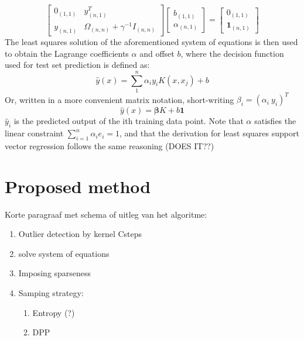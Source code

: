 \documentclass[preprint,12pt]{elsarticle}
\begin{document}
\begin{equation}
	\begin{bmatrix}
		0_{(1,1)} & y_{(n,1)}^T \\
		y_{(n,1)} & \Omega_{(n,n)} + \gamma^{-1} I_{(n,n)} 
		\end{bmatrix}	
		\begin{bmatrix}
		b_{(1,1)} \\
		\alpha_{(n,1)}
		\end{bmatrix}
		=
		\begin{bmatrix}
		0_{(1,1)} \\
		\mathbf{1}_{(n,1)}
	\end{bmatrix}	
\end{equation}
The least squares solution of the aforementioned system of equations is then used to  obtain the Lagrange coefficients $\alpha$ and offset $b$, where the decision function used for test set prediction is defined as:
\begin{equation}
	\hat{y}(x) = \sum_{1}^{n} \alpha_i y_i K(x, x_j) + b	
	\label{eq:classification}
\end{equation}
Or, written in a more convenient matrix notation, short-writing $\beta_i= (\alpha_i \  y_i)^T$
\begin{equation}
	\hat{y}(x) = \mathbf{\beta} K + b \mathbf{1}
	\label{eq:prediction}
\end{equation}
$\hat{y}_i$ is the predicted output of the ith training data point. Note that $\alpha$ satisfies the linear constraint $\sum_{i=1}^{n} \alpha_i  e_i = 1$, and that the derivation for least squares support vector regression follows the same reasoning (DOES IT??) %

\newpage

\section{Proposed method}
Korte paragraaf met schema of uitleg van het algoritme:
\begin{enumerate}
	\item Outlier detection by kernel Csteps
	\item solve system of equations
	\item Imposing sparseness
	\item Samping strategy: 
	\begin{enumerate}
		\item Entropy (?)
		\item DPP
	\end{enumerate}
\end{enumerate} 
\end{document}
